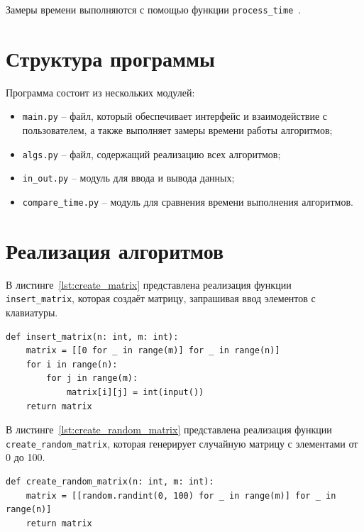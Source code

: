 \documentclass[a4paper, 12pt]{extreport}
\begin{document}
Замеры времени выполняются с помощью функции \texttt{process\_time}~\cite{bib4}.


\section{Структура программы}
Программа состоит из нескольких модулей: 
\begin{itemize}
    \item[--] \texttt{main.py} -- файл, который обеспечивает интерфейс и взаимодействие с пользователем, а также выполняет замеры времени работы алгоритмов; 
    \item[--] \texttt{algs.py} -- файл, содержащий реализацию всех алгоритмов; 
    \item[--] \texttt{in\_out.py} -- модуль для ввода и вывода данных; 
    \item[--] \texttt{compare\_time.py} -- модуль для сравнения времени выполнения алгоритмов.
\end{itemize}

\section{Реализация алгоритмов}

В листинге~\ref{lst:create_matrix} представлена реализация функции \texttt{insert\_matrix}, которая создаёт матрицу, запрашивая ввод элементов с клавиатуры.
\begin{center}
\captionsetup{justification=raggedright,singlelinecheck=off}
\begin{lstlisting}
def insert_matrix(n: int, m: int):
    matrix = [[0 for _ in range(m)] for _ in range(n)]
    for i in range(n):
        for j in range(m):
            matrix[i][j] = int(input())
    return matrix
\end{lstlisting}
\captionsetup{justification=centering, singlelinecheck=off}
\label{lst:create_matrix}
\end{center}

В листинге~\ref{lst:create_random_matrix} представлена реализация функции \texttt{create\_random\_matrix}, которая генерирует случайную матрицу с элементами от 0 до 100.
\begin{center}
\captionsetup{justification=raggedright,singlelinecheck=off}
\begin{lstlisting}
def create_random_matrix(n: int, m: int):
    matrix = [[random.randint(0, 100) for _ in range(m)] for _ in range(n)]  
    return matrix
\end{lstlisting}
\captionsetup{justification=centering, singlelinecheck=off}
\label{lst:create_random_matrix}
\end{center}
\end{document}
